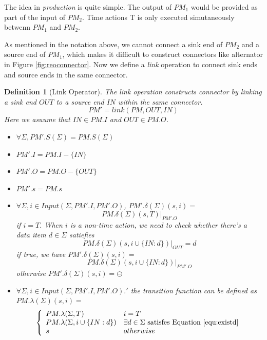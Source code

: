 \documentclass[conference, a4paper]{IEEEtran}
\newtheorem{definition}{Definition}
\newcommand{\rblock}[0]{\circleddash}
\begin{document}
The idea in \emph{production} is quite simple. The output of $PM_1$ would be provided as part of the
input of $PM_2$. Time actions T is only executed simutaneously betwenn $PM_1$ and $PM_2$.

As mentioned in the notation above, we cannot connect a sink end of $PM_2$ and a source end of
$PM_1$, which makes it difficult to construct connectors like alternator in Figure
\ref{fig:reoconnector}. Now we define a \emph{link} operation to connect sink ends and source ends
in the same connector.

\begin{definition}[Link Operator]
  The \emph{link} operation constructs connector by linking a sink end $OUT$ to a source end $IN$
  within the same connector.   
  \[
  PM' = link(PM, OUT, IN)
  \]
  Here we asuume that $IN\in PM.I$ and $OUT\in PM.O$.

  \begin{itemize}
  	\item[-] $\forall\Sigma, PM'.S(\Sigma)=PM.S(\Sigma)$
    \item[-] $PM'.I=PM.I-\{IN\}$
    \item[-] $PM'.O=PM.O-\{OUT\}$
    \item[-] $PM'.s=PM.s$
    \item[-] $\forall\Sigma, i\in Input(\Sigma,PM'.I,PM'.O)$, $PM'.\delta(\Sigma)(s, i)=$
      \begin{equation}
        \label{equ:existd}
        PM.\delta(\Sigma)(s,T)|_{PM'.O}
      \end{equation}
      if $i=T$. When $i$ is a non-time action, we need to check whether there's a data item
      $d\in\Sigma$
      satiefies
      \[
      PM.\delta(\Sigma)(s,i\cup\{IN:d\})|_{OUT} = d
      \]
      if \emph{true}, we have $PM'.\delta(\Sigma)(s, i)=$
      \[
      PM.\delta(\Sigma)(s,i\cup\{IN:d\})|_{PM'.O}
      \]
      otherwise $PM'.\delta(\Sigma)(s, i)=\rblock$
    \item[-] $\forall\Sigma, i\in Input(\Sigma,PM'.I,PM'.O).'$ the transition
      function can be defined as $PM.\lambda(\Sigma)(s,i)=$
      \begin{displaymath}
        \left\{
        \begin{array}[h]{ll}
          PM.\lambda(\Sigma,T) & i=T \\
          PM.\lambda(\Sigma,i\cup\{IN:d\}) & \exists d\in\Sigma \mbox{ satisfes Equation
          \ref{equ:existd}} \\
          s & otherwise \\
        \end{array}
        \right.
      \end{displaymath}
  \end{itemize}
\end{definition}
\end{document}
